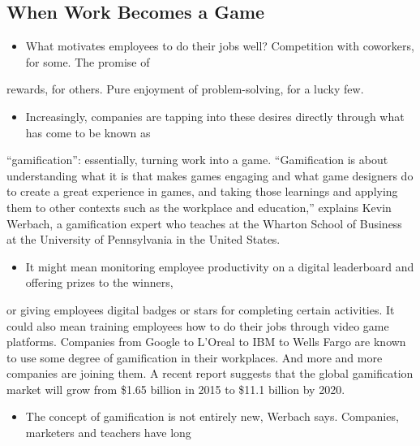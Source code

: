 \documentclass[UTF8,11pt]{ctexart}
\begin{document}
\subsection*{\textbf{When Work Becomes a Game}}


\begin{itemize}[leftmargin=2em,itemsep=.2em,topsep=.4em]\item[A.] What motivates employees to do their jobs well? Competition with coworkers, for some. The promise of
\end{itemize}

rewards, for others. Pure enjoyment of problem-solving, for a lucky few.


\begin{itemize}[leftmargin=2em,itemsep=.2em,topsep=.4em]\item[B.] Increasingly, companies are tapping into these desires directly through what has come to be known as
\end{itemize}

“gamification”: essentially, turning work into a game. “Gamification is about understanding what it is that makes games engaging and what game designers do to create a great experience in games, and taking those learnings and applying them to other contexts such as the workplace and education,” explains Kevin Werbach, a gamification expert who teaches at the Wharton School of Business at the University of Pennsylvania in the United States.


\begin{itemize}[leftmargin=2em,itemsep=.2em,topsep=.4em]\item[C.] It might mean monitoring employee productivity on a digital leaderboard and offering prizes to the winners,
\end{itemize}

or giving employees digital badges or stars for completing certain activities. It could also mean training employees how to do their jobs through video game platforms. Companies from Google to L’Oreal to IBM to Wells Fargo are known to use some degree of gamification in their workplaces. And more and more companies are joining them. A recent report suggests that the global gamification market will grow from \$1.65 billion in 2015 to \$11.1 billion by 2020.


\begin{itemize}[leftmargin=2em,itemsep=.2em,topsep=.4em]\item[D.] The concept of gamification is not entirely new, Werbach says. Companies, marketers and teachers have long
\end{itemize}
\end{document}
